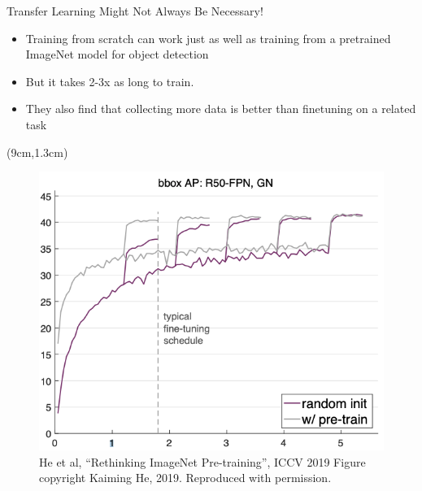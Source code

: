 \documentclass[serif, aspectratio=169]{beamer}
\begin{document}
\begin{frame}{Transfer Learning Might Not Always Be Necessary!}
	\begin{itemize}
		\item Training from scratch can work just \newline as well as training from a pretrained
		\newline ImageNet model for object detection
		\item But it takes 2-3x as long to train.
		\item They also find that collecting more \newline data is better than finetuning on a 
		\newline related task
	\end{itemize}
	\begin{textblock*}{5cm}(9cm,1.3cm) %
		\begin{figure}
			\includegraphics[keepaspectratio, scale=0.28]{pic/rethinking_imagenet}
			\caption*{\scriptsize He et al, “Rethinking ImageNet Pre-training”, ICCV 2019 Figure copyright Kaiming He, 2019. Reproduced with permission.}
		\end{figure}
	\end{textblock*}
\end{frame}
\end{document}
